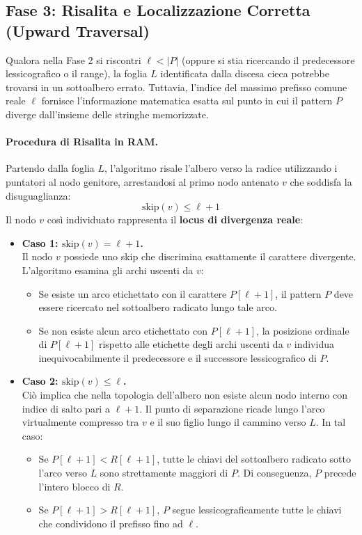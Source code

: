 \FloatBarrier
\subsection{Fase 3: Risalita e Localizzazione Corretta (Upward Traversal)}
\label{subsec:fase-3-risalita}

Qualora nella Fase 2 si riscontri $\ell < |P|$ (oppure si stia ricercando il predecessore lessicografico o il range), la foglia $L$ identificata dalla discesa cieca potrebbe trovarsi in un sottoalbero errato. Tuttavia, l'indice del massimo prefisso comune reale $\ell$ fornisce l'informazione matematica esatta sul punto in cui il pattern $P$ diverge dall'insieme delle stringhe memorizzate.

\paragraph{Procedura di Risalita in RAM.}
Partendo dalla foglia $L$, l'algoritmo risale l'albero verso la radice utilizzando i puntatori al nodo genitore, arrestandosi al primo nodo antenato $v$ che soddisfa la disuguaglianza:
\begin{equation}
  \text{skip}(v) \le \ell + 1
\end{equation}
Il nodo $v$ cos\`i individuato rappresenta il \textbf{locus di divergenza reale}:

\begin{itemize}
  \item \textbf{Caso 1: $\text{skip}(v) = \ell + 1$.} \\
  Il nodo $v$ possiede uno skip che discrimina esattamente il carattere divergente. L'algoritmo esamina gli archi uscenti da $v$:
  \begin{itemize}
    \item Se esiste un arco etichettato con il carattere $P[\ell + 1]$, il pattern $P$ deve essere ricercato nel sottoalbero radicato lungo tale arco.
    \item Se non esiste alcun arco etichettato con $P[\ell + 1]$, la posizione ordinale di $P[\ell + 1]$ rispetto alle etichette degli archi uscenti da $v$ individua inequivocabilmente il predecessore e il successore lessicografico di $P$.
  \end{itemize}
  \item \textbf{Caso 2: $\text{skip}(v) \le \ell$.} \\
  Ci\`o implica che nella topologia dell'albero non esiste alcun nodo interno con indice di salto pari a $\ell + 1$. Il punto di separazione ricade lungo l'arco virtualmente compresso tra $v$ e il suo figlio lungo il cammino verso $L$. In tal caso:
  \begin{itemize}
    \item Se $P[\ell + 1] < R[\ell + 1]$, tutte le chiavi del sottoalbero radicato sotto l'arco verso $L$ sono strettamente maggiori di $P$. Di conseguenza, $P$ precede l'intero blocco di $R$.
    \item Se $P[\ell + 1] > R[\ell + 1]$, $P$ segue lessicograficamente tutte le chiavi che condividono il prefisso fino ad $\ell$.
  \end{itemize}
\end{itemize}


